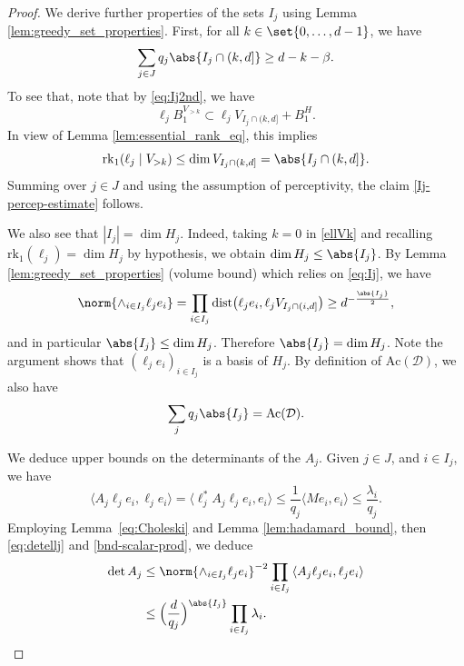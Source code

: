 \begin{proof}
We derive further properties of the sets $I_{j}$ using Lemma \ref{lem:greedy_set_properties}. First, for all $k\in \set{0, \dotsc, d - 1}$, we have
\begin{equation}\label{Ij-percep-estimate}
\sum_{j\in J} q_{j} \abs{I_j \cap (k, d] }  \geq d - k - \beta.
\end{equation}
To see that, note that by \eqref{eq:Ij2nd}, we have
\begin{equation*}%
\ell_j B_{1}^{V_{> k}} \subset \ell_j V_{I_j \cap (k,d]} + B^H_{1}.
\end{equation*}
In view of Lemma \ref{lem:essential_rank_eq}, this implies
\begin{equation}\label{ellVk}
\mathrm{rk}_1(\ell_j \mid V_{> k}) \leq \dim V_{I_j \cap (k, d]} = \abs{I_j \cap (k, d]}.
\end{equation}
Summing over $j \in J$ and using the assumption of perceptivity, the claim \eqref{Ij-percep-estimate} follows.


We also see that $|I_{j}|=\dim H_{j}$. Indeed, taking $k=0$ in \eqref{ellVk} and recalling $\mathrm{rk}_{1}(\ell_j) = \dim H_j$ by hypothesis, we obtain $\dim H_j \leq \abs{I_j}$.
By Lemma \ref{lem:greedy_set_properties} (volume bound) which relies on \eqref{eq:Ij}, we have
\begin{equation}\label{eq:detellj}
\norm{\wedge_{i\in I_{j}}\ell_{j}e_{i} } = \prod_{i \in I_j} \mathrm{dist}\bigl(\ell_j e_i, \ell_j V_{I_j \cap (i,d]}\bigr) \geq d^{-\frac{\abs{I_j}}{2}},
\end{equation}
and in particular $\abs{I_j} \leq \dim H_j$.
Therefore $\abs{I_j}=\dim H_{j}$. Note the argument shows that $(\ell_{j}e_{i})_{i\in I_{j}}$ is a basis of $H_{j}$. By definition of $\mathrm{Ac}(\mathcal{D})$, we also have
\begin{equation}\label{Ij-cardinal}
\sum_{j}q_{j} \abs{I_{j}} = \mathrm{Ac}(\mathcal{D}).
\end{equation}


We deduce upper bounds on the determinants of the $A_{j}$.
Given $j \in J$, and $i\in I_j$, we have
\begin{equation}\label{bnd-scalar-prod}
{\langle A_{j}\ell_{j}e_{i},  \ell_{j} e_{i}\rangle} = {\langle \ell_{j}^*A_{j}\ell_{j}e_{i}, e_{i}\rangle} \leq \frac{1}{q_j} {\langle M e_{i}, e_{i}\rangle} \leq \frac{\lambda_i}{q_j}.
\end{equation}
Employing Lemma~\ref{eq:Choleski} and Lemma \ref{lem:hadamard_bound}, then \eqref{eq:detellj} and \eqref{bnd-scalar-prod}, we deduce
\begin{align*}
{\det A_{j}} & \leq \norm{\wedge_{i\in I_{j}}\ell_{j}e_{i} }^{-2} \prod_{i\in I_{j}}{\langle A_{j}\ell_{j}e_{i},  \ell_{j} e_{i}\rangle}\\
&\leq \Bigl(\frac{d}{q_j}\Bigr)^{\abs{I_j}} \prod_{i\in I_{j}}\lambda_{i}.
\end{align*}


\end{proof}
